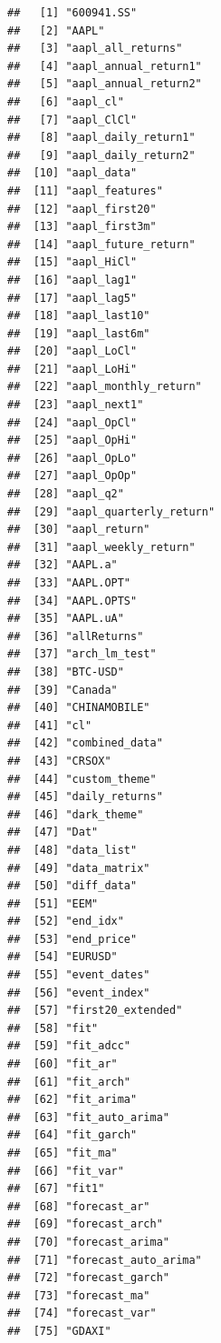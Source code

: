 \documentclass[]{ctexbook}
\begin{document}
\begin{verbatim}
##   [1] "600941.SS"             
##   [2] "AAPL"                  
##   [3] "aapl_all_returns"      
##   [4] "aapl_annual_return1"   
##   [5] "aapl_annual_return2"   
##   [6] "aapl_cl"               
##   [7] "aapl_ClCl"             
##   [8] "aapl_daily_return1"    
##   [9] "aapl_daily_return2"    
##  [10] "aapl_data"             
##  [11] "aapl_features"         
##  [12] "aapl_first20"          
##  [13] "aapl_first3m"          
##  [14] "aapl_future_return"    
##  [15] "aapl_HiCl"             
##  [16] "aapl_lag1"             
##  [17] "aapl_lag5"             
##  [18] "aapl_last10"           
##  [19] "aapl_last6m"           
##  [20] "aapl_LoCl"             
##  [21] "aapl_LoHi"             
##  [22] "aapl_monthly_return"   
##  [23] "aapl_next1"            
##  [24] "aapl_OpCl"             
##  [25] "aapl_OpHi"             
##  [26] "aapl_OpLo"             
##  [27] "aapl_OpOp"             
##  [28] "aapl_q2"               
##  [29] "aapl_quarterly_return" 
##  [30] "aapl_return"           
##  [31] "aapl_weekly_return"    
##  [32] "AAPL.a"                
##  [33] "AAPL.OPT"              
##  [34] "AAPL.OPTS"             
##  [35] "AAPL.uA"               
##  [36] "allReturns"            
##  [37] "arch_lm_test"          
##  [38] "BTC-USD"               
##  [39] "Canada"                
##  [40] "CHINAMOBILE"           
##  [41] "cl"                    
##  [42] "combined_data"         
##  [43] "CRSOX"                 
##  [44] "custom_theme"          
##  [45] "daily_returns"         
##  [46] "dark_theme"            
##  [47] "Dat"                   
##  [48] "data_list"             
##  [49] "data_matrix"           
##  [50] "diff_data"             
##  [51] "EEM"                   
##  [52] "end_idx"               
##  [53] "end_price"             
##  [54] "EURUSD"                
##  [55] "event_dates"           
##  [56] "event_index"           
##  [57] "first20_extended"      
##  [58] "fit"                   
##  [59] "fit_adcc"              
##  [60] "fit_ar"                
##  [61] "fit_arch"              
##  [62] "fit_arima"             
##  [63] "fit_auto_arima"        
##  [64] "fit_garch"             
##  [65] "fit_ma"                
##  [66] "fit_var"               
##  [67] "fit1"                  
##  [68] "forecast_ar"           
##  [69] "forecast_arch"         
##  [70] "forecast_arima"        
##  [71] "forecast_auto_arima"   
##  [72] "forecast_garch"        
##  [73] "forecast_ma"           
##  [74] "forecast_var"          
##  [75] "GDAXI"                 

\end{verbatim}
\end{document}
